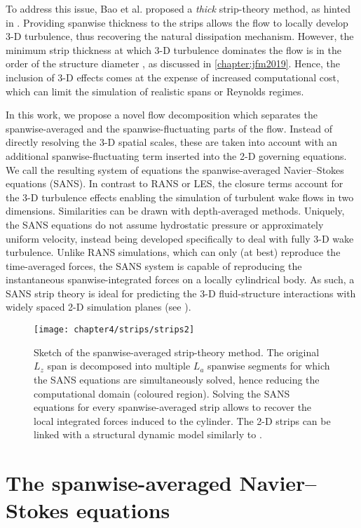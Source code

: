 \documentclass[../main.tex]{subfiles}
\begin{document}
To address this issue, Bao et al. \citep{Bao2016, Bao2019} proposed a \textit{thick} strip-theory method, as hinted in \cite{Herfjord1999}.
Providing spanwise thickness to the strips allows the flow to locally develop 3-D turbulence, thus recovering the natural dissipation mechanism.
However, the minimum strip thickness at which 3-D turbulence dominates the flow is in the order of the structure diameter \citep{Bao2016,Font2019}, as discussed in \cref{chapter:jfm2019}. Hence, the inclusion of 3-D effects comes at the expense of increased computational cost, which can limit the simulation of realistic spans or Reynolds regimes. 

In this work, we propose a novel flow decomposition which separates the spanwise-averaged and the spanwise-fluctuating parts of the flow.
Instead of directly resolving the 3-D spatial scales, these are taken into account with an additional spanwise-fluctuating term inserted into the 2-D governing equations.
We call the resulting system of equations the spanwise-averaged Navier--Stokes equations (SANS).
In contrast to RANS or LES, the closure terms account for the 3-D turbulence effects enabling the simulation of turbulent wake flows in two dimensions.
Similarities can be drawn with depth-averaged methods.
Uniquely, the SANS equations do not assume hydrostatic pressure or approximately uniform velocity, instead being developed specifically to deal with fully 3-D wake turbulence.
Unlike RANS simulations, which can only (at best) reproduce the time-averaged forces, the SANS system is capable of reproducing the instantaneous spanwise-integrated forces on a locally cylindrical body. 
As such, a SANS strip theory is ideal for predicting the 3-D fluid-structure interactions with widely spaced 2-D simulation planes (see ).

\begin{figure}[t]
\centering
\texttt{[image: chapter4/strips/strips2]}
\caption{
Sketch of the spanwise-averaged strip-theory method.
The original $L_z$ span is decomposed into multiple $L_a$ spanwise segments for which the SANS equations are simultaneously solved, hence reducing the computational domain (coloured region).
Solving the SANS equations for every spanwise-averaged strip allows to recover the local integrated forces induced to the cylinder.
The 2-D strips can be linked with a structural dynamic model similarly to \cite{Bao2016, Bao2019}.}
\label{fig:strips}
\end{figure}

\section{The spanwise-averaged Navier--Stokes equations}\label{sec:SANS_eqs}
\end{document}
